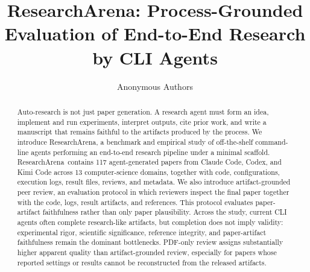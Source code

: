 \documentclass{article}
\title{ResearchArena: Process-Grounded Evaluation of End-to-End Research by CLI Agents}
\author{Anonymous Authors}
\newcommand{\ra}{ResearchArena}
\begin{document}
\maketitle

\begin{abstract}
Auto-research is not just paper generation. A research agent must form an idea, implement and run experiments, interpret outputs, cite prior work, and write a manuscript that remains faithful to the artifacts produced by the process. We introduce \ra, a benchmark and empirical study of off-the-shelf command-line agents performing an end-to-end research pipeline under a minimal scaffold. \ra\ contains 117 agent-generated papers from Claude Code, Codex, and Kimi Code across 13 computer-science domains, together with code, configurations, execution logs, result files, reviews, and metadata. We also introduce artifact-grounded peer review, an evaluation protocol in which reviewers inspect the final paper together with the code, logs, result artifacts, and references. This protocol evaluates paper-artifact faithfulness rather than only paper plausibility. Across the study, current CLI agents often complete research-like artifacts, but completion does not imply validity: experimental rigor, scientific significance, reference integrity, and paper-artifact faithfulness remain the dominant bottlenecks. PDF-only review assigns substantially higher apparent quality than artifact-grounded review, especially for papers whose reported settings or results cannot be reconstructed from the released artifacts.
\end{abstract}














\clearpage
\appendix

\end{document}
